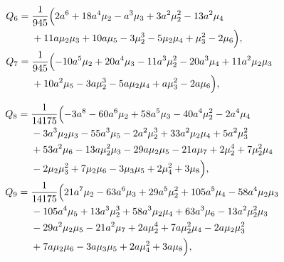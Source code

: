 \documentclass[9pt,twocolumn,twoside]{gsajnl}
\begin{document}
\vspace*{-0.4cm}
\begin{equation*}
\hspace*{-1.08cm}
\begin{aligned}
Q_6={}&\frac1{945}\Bigl(
2a^6+18a^4\mu_2-a^3\mu_3+3a^2\mu_2^2-13a^2\mu_4
\notag\\
&+11a\mu_2\mu_3+10a\mu_5-3\mu_2^3-5\mu_2\mu_4+\mu_3^2-2\mu_6
\Bigr), \\
Q_7={}&\frac1{945}\Bigl(
-10a^5\mu_2+20a^4\mu_3-11a^3\mu_2^2-20a^3\mu_4+11a^2\mu_2\mu_3
\notag\\
&+10a^2\mu_5-3a\mu_2^3-5a\mu_2\mu_4+a\mu_3^2-2a\mu_6
\Bigr),
\end{aligned}
\end{equation*}

\vspace*{-0.4cm}
\begin{equation*}
\hspace*{-0.88cm}
\begin{aligned}
Q_8={}&\frac1{14175}\Bigl(
-3a^8-60a^6\mu_2+58a^5\mu_3-40a^4\mu_2^2-2a^4\mu_4
\notag\\
&-3a^3\mu_2\mu_3-55a^3\mu_5-2a^2\mu_2^3+33a^2\mu_2\mu_4+5a^2\mu_3^2
\notag\\
&+53a^2\mu_6-13a\mu_2^2\mu_3-29a\mu_2\mu_5-21a\mu_7+2\mu_2^4+7\mu_2^2\mu_4
\notag\\
&-2\mu_2\mu_3^2+7\mu_2\mu_6-3\mu_3\mu_5+2\mu_4^2+3\mu_8
\Bigr), \\
Q_9={}&\frac1{14175}\Bigl(
21a^7\mu_2-63a^6\mu_3+29a^5\mu_2^2+105a^5\mu_4-58a^4\mu_2\mu_3
\notag\\
&-105a^4\mu_5+13a^3\mu_2^3+58a^3\mu_2\mu_4+63a^3\mu_6-13a^2\mu_2^2\mu_3
\notag\\
&-29a^2\mu_2\mu_5-21a^2\mu_7+2a\mu_2^4+7a\mu_2^2\mu_4-2a\mu_2\mu_3^2
\notag\\
&+7a\mu_2\mu_6-3a\mu_3\mu_5+2a\mu_4^2+3a\mu_8
\Bigr),
\end{aligned}
\end{equation*}

\end{document}
